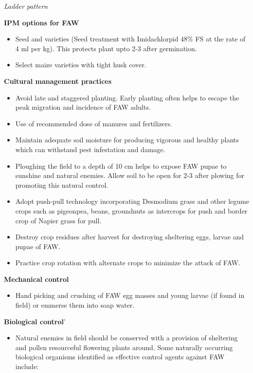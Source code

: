 \documentclass[
  openany]{book}
\providecommand{\tightlist}{%
  \setlength{\itemsep}{0pt}\setlength{\parskip}{0pt}}
\begin{document}
\emph{Ladder pattern}

\textbf{IPM options for FAW}

\begin{itemize}
\tightlist
\item
  Seed and varieties (Seed treatment with Imidachlorpid 48\% FS at the rate of 4 ml per kg). This protects plant upto 2-3 after germination.
\item
  Select maize varieties with tight husk cover.
\end{itemize}

\textbf{Cultural management practices}

\begin{itemize}
\tightlist
\item
  Avoid late and staggered planting. Early planting often helps to escape the peak migration and incidence of FAW adults.
\item
  Use of recommended dose of manures and fertilizers.
\item
  Maintain adequate soil moisture for producing vigorous and healthy plants which can withstand pest infestation and damage.
\item
  Ploughing the field to a depth of 10 cm helps to expose FAW pupae to sunshine and natural enemies. Allow soil to be open for 2-3 after plowing for promoting this natural control.
\item
  Adopt push-pull technology incorporating Desmodium grass and other legume crops such as pigeonpea, beans, groundnuts as intercrops for push and border crop of Napier grass for pull.
\item
  Destroy crop residues after harvest for destroying sheltering eggs, larvae and pupae of FAW.
\item
  Practice crop rotation with alternate crops to minimize the attack of FAW.
\end{itemize}

\textbf{Mechanical control}

\begin{itemize}
\tightlist
\item
  Hand picking and crushing of FAW egg masses and young larvae (if found in field) or emmerse them into soap water.
\end{itemize}

\textbf{Biological control}'

\begin{itemize}
\tightlist
\item
  Natural enemies in field should be conserved with a provision of sheltering and pollen resourceful flowering plants around. Some naturally occurring biological organisms identified as effective control agents against FAW include:
\end{itemize}
\end{document}
